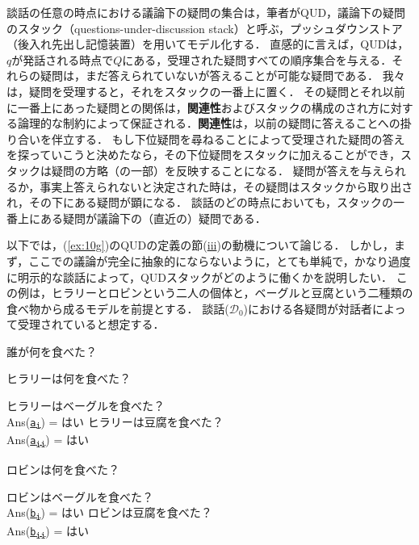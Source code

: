 \documentclass{goken}
\newcommand{\term}[2]{\textsf{#1}（#2）}
\newcommand{\disrefsub}[3]{\hyperref[#1]{\texttt{#2\textsubscript{#3}}}}
\newcommand{\ori}[1]{\noindent\textcolor[gray]{0.7}{\fontsize{8pt}{8pt}\selectfont{\textsf{(p.~#1)}}} }
\begin{document}
談話の任意の時点における議論下の疑問の集合は，筆者がQUD，\term{議論下の疑問のスタック}{questions-under-discussion stack}と呼ぶ，プッシュダウンストア（後入れ先出し記憶装置）を用いてモデル化する．
直感的に言えば，QUDは，$q$が発話される時点で$Q$にある，受理された疑問すべての順序集合を与える．それらの疑問は，まだ答えられていないが答えることが可能な疑問である．
我々は，疑問を受理すると，それをスタックの一番上に置く．
その疑問とそれ以前に一番上にあった疑問との関係は，\textbf{関連性}およびスタックの構成のされ方に対する論理的な制約によって保証される．\textbf{関連性}は，以前の疑問に答えることへの掛り合いを伴立する．
\ori{16}
もし下位疑問を尋ねることによって受理された疑問の答えを探っていこうと決めたなら，その下位疑問をスタックに加えることができ，スタックは疑問の方略（の一部）を反映することになる．
疑問が答えを与えられるか，事実上答えられないと決定された時は，その疑問はスタックから取り出され，その下にある疑問が顕になる．
談話のどの時点においても，スタックの一番上にある疑問が議論下の（直近の）疑問である．

以下では，(\ref{ex:10g})のQUDの定義の節(\hyperref[ex:10giii]{iii})の動機について論じる．
しかし，まず，ここでの議論が完全に抽象的にならないように，とても単純で，かなり過度に明示的な談話によって，QUDスタックがどのように働くかを説明したい．
この例は，ヒラリーとロビンという二人の個体と，ベーグルと豆腐という二種類の食べ物から成るモデルを前提とする．
談話($\mathcal{D}_0$)における各疑問が対話者によって受理されていると想定する．

\begin{exe}
 \label{D0}
	\begin{xlist}
	 誰が何を食べた？ \label{D0:1}
	\begin{xlist}
		 ヒラリーは何を食べた？ \label{D0:1a}
		\begin{xlist}
			 ヒラリーはベーグルを食べた？ \label{D0:1ai}\\
			Ans(\disrefsub{D0:1ai}{a}{i}) = はい
			 ヒラリーは豆腐を食べた？ \label{D0:1aii}\\
			Ans(\disrefsub{D0:1aii}{a}{ii}) = はい
		\end{xlist}
		 ロビンは何を食べた？ \label{D0:1b}
		\begin{xlist}
			 ロビンはベーグルを食べた？ \label{D0:1bi}\\
			Ans(\disrefsub{D0:1bi}{b}{i}) = はい
			 ロビンは豆腐を食べた？ \label{D0:1bii}\\
			Ans(\disrefsub{D0:1bii}{b}{ii}) = はい
		\end{xlist}
	\end{xlist}
\end{xlist}
\end{exe}
\end{document}
